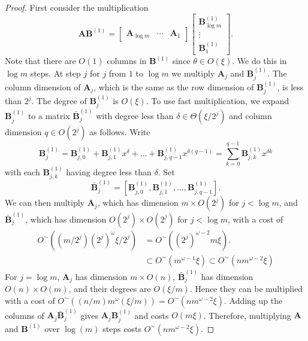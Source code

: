 \begin{proof}
First consider the multiplication 
\[
\mathbf{A}\mathbf{B}^{\left(1\right)}=\left[\begin{array}{ccc}
\mathbf{A}_{\log m} & \cdots & \mathbf{A}_{1}\end{array}\right]\left[\begin{array}{l}
\mathbf{B}_{\log m}^{\left(1\right)}\\
\vdots\\
\mathbf{B}_{1}^{\left(1\right)}
\end{array}\right].
\]
 Note that there are $O\left(1\right)$ columns in $\mathbf{B}^{(1)}$
since $\theta\in O\left(\xi\right)$. We do this in $\log m$ steps.
At step $j$ for $j$ from $1$ to $\log m$ we multiply $\mathbf{A}_{j}$
and $\mathbf{B}_{j}^{(1)}$. The column dimension of $\mathbf{A}_{j}$,
which is the same as the row dimension of $\mathbf{B}_{j}^{(1)}$,
is less than $2^{j}$. The degree of $\mathbf{B}_{j}^{(1)}$ is $O\left(\xi\right)$.
To use fast multiplication, we expand $\mathbf{B}_{j}^{(1)}$ to a
matrix $\bar{\mathbf{B}}_{j}^{(1)}$ with degree less than $\delta\in\Theta(\xi/2^{j})$
and column dimension $q\in O(2^{j})$ as follows. Write 
\[
\mathbf{B}_{j}^{(1)}=\mathbf{B}_{j,0}^{(1)}+\mathbf{B}_{j,1}^{(1)}x^{\delta}+\dots+\mathbf{B}_{j,q-1}^{(1)}x^{\delta(q-1)}=\sum_{k=0}^{q-1}\mathbf{B}_{j,k}^{(1)}x^{\delta k}
\]
 with each $\mathbf{B}_{j,k}^{(1)}$ having degree less than $\delta.$
Set 
\[
\bar{\mathbf{B}}_{j}^{(1)}=\left[\mathbf{B}_{j,0}^{(1)},\mathbf{B}_{j,1}^{(1)},\dots,\mathbf{B}_{j,q-1}^{(1)}\right].
\]
 We can then multiply $\mathbf{A}_{j}$, which has dimension $m\times O(2^{j})$
for $j<\log m$, and $\bar{\mathbf{B}}_{j}^{(1)}$, which has dimension
$O(2^{j})\times O(2^{j})$ for $j<\log m$, with a cost of 
\begin{align*}
O^{\sim}\left((m/2^{j})\left(2^{j}\right)^{\omega}\xi/2^{j}\right) & =O^{\sim}\left(\left(2^{j}\right)^{\omega-2}m\xi\right).\\
 & \subset O^{\sim}\left(m^{\omega-1}\xi\right)\subset O^{\sim}(nm^{\omega-2}\xi)
\end{align*}
 For $j=\log m$, $\mathbf{A}_{j}$ has dimension $m\times O\left(n\right)$,
$\bar{\mathbf{B}}_{j}^{\left(1\right)}$ has dimension $O\left(n\right)\times O(m)$,
and their degrees are $O\left(\xi/m\right)$. Hence they can be multiplied
with a cost of $O^{\sim}\left((n/m)m^{\omega}(\xi/m)\right)=O^{\sim}\left(nm^{\omega-2}\xi\right)$.
Adding up the columns of $\mathbf{A}_{j}\bar{\mathbf{B}}_{j}^{(1)}$
gives $\mathbf{A}_{j}\mathbf{B}_{j}^{(1)}$ and costs $O(m\xi)$.
Therefore, multiplying $\mathbf{A}$ and $\mathbf{B}^{(1)}$ over
$\log(m)$ steps costs $O^{\sim}\left(nm^{\omega-2}\xi\right)$.


\end{proof}
